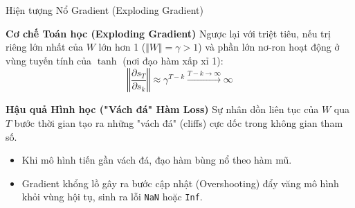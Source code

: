 \begin{frame}{Hiện tượng Nổ Gradient (Exploding Gradient)}
\small
\begin{alertblock}{\textbf{Cơ chế Toán học (Exploding Gradient)}}
Ngược lại với triệt tiêu, nếu trị riêng lớn nhất của $W$ lớn hơn 1 ($\Vert W \Vert = \gamma > 1$) và phần lớn nơ-ron hoạt động ở vùng tuyến tính của $\tanh$ (nơi đạo hàm xấp xỉ 1):
\[ \left\Vert \frac{\partial s_T}{\partial s_k} \right\Vert \approx \gamma^{T-k} \xrightarrow{T-k \to \infty} \infty \]
\end{alertblock}

\vspace{0.1cm}
\begin{block}{\textbf{Hậu quả Hình học ("Vách đá" Hàm Loss)}}
Sự nhân dồn liên tục của $W$ qua $T$ bước thời gian tạo ra những "vách đá" (cliffs) cực dốc trong không gian tham số. 
\begin{itemize}
    \item Khi mô hình tiến gần vách đá, đạo hàm bùng nổ theo hàm mũ.
    \item Gradient khổng lồ gây ra bước cập nhật (Overshooting) đẩy văng mô hình khỏi vùng hội tụ, sinh ra lỗi \texttt{NaN} hoặc \texttt{Inf}.
\end{itemize}
\end{block}
\end{frame}

